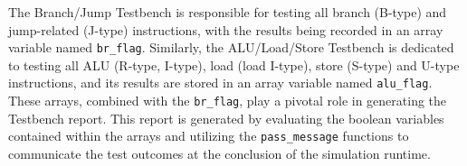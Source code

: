 \documentclass[12pt,a4paper,oneside]{book} %
\begin{document}


The Branch/Jump Testbench is responsible for testing all branch (B-type) and jump-related (J-type) instructions, with the results being recorded in an array variable named \texttt{br\_flag}. Similarly, the ALU/Load/Store Testbench is dedicated to testing all ALU (R-type, I-type), load (load I-type), store (S-type) and U-type instructions, and its results are stored in an array variable named \texttt{alu\_flag}. These arrays, combined with the \texttt{br\_flag}, play a pivotal role in generating the Testbench report. This report is generated by evaluating the boolean variables contained within the arrays and utilizing the \texttt{pass\_message} functions to communicate the test outcomes at the conclusion of the simulation runtime.
\end{document}
